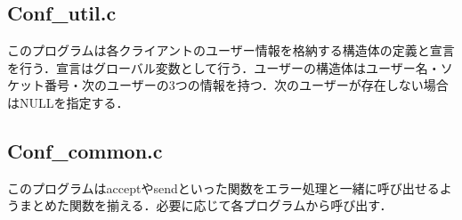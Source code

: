 \documentclass[11pt]{jsarticle}
\begin{document}
    \subsection{Conf\_util.c}
        このプログラムは各クライアントのユーザー情報を格納する構造体の定義と宣言を行う．宣言はグローバル変数として行う．ユーザーの構造体はユーザー名・ソケット番号・次のユーザーの3つの情報を持つ．次のユーザーが存在しない場合はNULLを指定する．
        
    \subsection{Conf\_common.c}
        このプログラムはacceptやsendといった関数をエラー処理と一緒に呼び出せるようまとめた関数を揃える．必要に応じて各プログラムから呼び出す．
\end{document}
